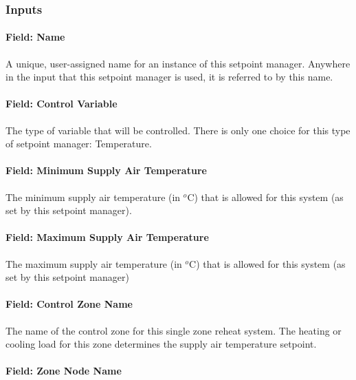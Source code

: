 \subsubsection{Inputs}\label{inputs-3-033}

\paragraph{Field: Name}\label{field-name-3-029}

A unique, user-assigned name for an instance of this setpoint manager. Anywhere in the input that this setpoint manager is used, it is referred to by this name.

\paragraph{Field: Control Variable}\label{field-control-variable-3}

The type of variable that will be controlled. There is only one choice for this type of setpoint manager: Temperature.

\paragraph{Field: Minimum Supply Air Temperature}\label{field-minimum-supply-air-temperature}

The minimum supply air temperature (in \(^{o}\)C) that is allowed for this system (as set by this setpoint manager).

\paragraph{Field: Maximum Supply Air Temperature}\label{field-maximum-supply-air-temperature}

The maximum supply air temperature (in \(^{o}\)C) that is allowed for this system (as set by this setpoint manager)

\paragraph{Field: Control Zone Name}\label{field-control-zone-name}

The name of the control zone for this single zone reheat system. The heating or cooling load for this zone determines the supply air temperature setpoint.

\paragraph{Field: Zone Node Name}\label{field-zone-node-name-000}

